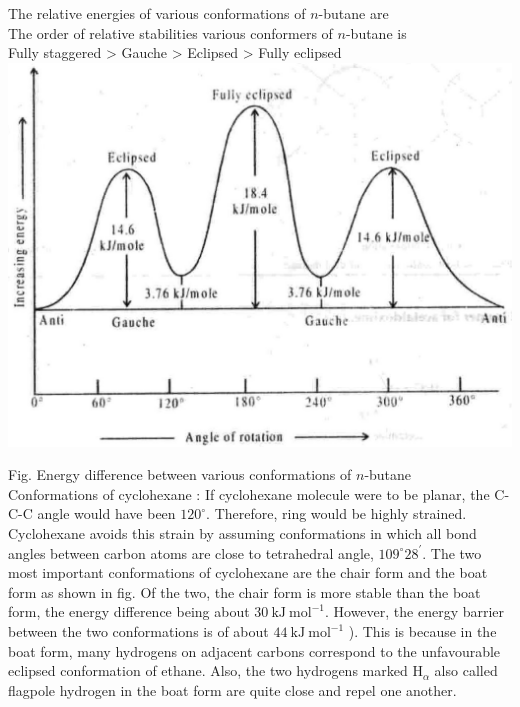 \documentclass[10pt]{article}
\begin{document}
The relative energies of various conformations of $n$-butane are\\
The order of relative stabilities various conformers of $n$-butane is\\
Fully staggered > Gauche > Eclipsed > Fully eclipsed\\
\includegraphics[max width=\textwidth, center]{2025_01_28_8470952b98110cec3aabg-061(2)}

Fig. Energy difference between various conformations of $n$-butane\\
Conformations of cyclohexane : If cyclohexane molecule were to be planar, the C-C-C angle would have been $120^{\circ}$. Therefore, ring would be highly strained. Cyclohexane avoids this strain by assuming conformations in which all bond angles between carbon atoms are close to tetrahedral angle, $109^{\circ} 28^{\prime}$. The two most important conformations of cyclohexane are the chair form and the boat form as shown in fig. Of the two, the chair form is more stable than the boat form, the energy difference being about $30 \mathrm{~kJ} \mathrm{~mol}^{-1}$. However, the energy barrier between the two conformations is of about $44 \mathrm{~kJ} \mathrm{~mol}^{-1}$ ). This is because in the boat form, many hydrogens on adjacent carbons correspond to the unfavourable eclipsed conformation of ethane. Also, the two hydrogens marked $\mathrm{H}_{\alpha}$ also called flagpole hydrogen in the boat form are quite close and repel one another.
\end{document}
